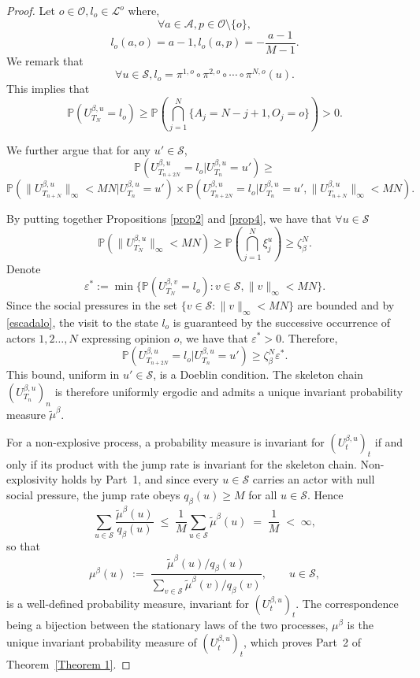 \documentclass[11pt]{article}
\theoremstyle{definition}
\newcommand{\st}{\mathcal{S}}
\def\P{{\mathbb P}}
\begin{document}
\begin{proof}
Let $o\in\mathcal{O}, l_o\in\mathcal{L}^o$ where,
$$
\forall a\in\mathcal{A},p\in\mathcal{O}\setminus\{o\},
$$
$$
    l_o(a,o)=a-1,l_o(a,p)=-\frac{a-1}{M-1}.
$$
We remark that 
$$
    \forall u \in \st, l_o=\pi^{1,o}\circ \pi^{2,o}\circ\cdots\circ\pi^{N,o}(u).
$$
This implies that
\begin{equation} \label{escadalo}
    \mathbb{P}(U_{T_N}^{\beta,u}=l_o)\geq \P\left(\bigcap_{j=1}^N\{A_j=N-j+1,O_j=o\}\right)>0.
\end{equation}

       
We further argue that for any $u'\in\st$,
$$
    \mathbb{P}(U^{\beta,u}_{T_{n+2N}}=l_o|U^{\beta,u}_{T_n}=u')\geq
$$
$$
    \mathbb{P}(\|U^{\beta,u}_{T_{n+N}}\|_\infty<MN|U^{\beta,u}_{T_n}=u')\times\mathbb{P}(U^{\beta,u}_{T_{n+2N}}=l_o|U^{\beta,u}_{T_n}=u',\|U^{\beta,u}_{T_{n+N}}\|_\infty<MN).
    $$

By putting together Propositions \ref{prop2} and \ref{prop4}, we have that $\forall u\in\st$
$$
\mathbb{P}(\|U^{\beta,u}_{T_N}\|_\infty<MN)\geq\mathbb{P}(\bigcap_{j=1}^N\xi_j^u)\geq \zeta^N_\beta.
 $$
Denote
$$
\varepsilon^*:=\min\{\mathbb{P}(U^{\beta,v}_{T_{N}}=l_o):v\in\st,\|v\|_\infty<MN\}.
$$
Since the social pressures in the set $\{v\in\st:\|v\|_\infty<MN\}$ are bounded and by \eqref{escadalo}, the visit to the state $l_o$ is guaranteed by the successive occurrence of actors $1,2 \ldots, N$ expressing opinion $o$, we have that $\varepsilon^*>0$. Therefore,
$$
        \mathbb{P}(U^{\beta,u}_{T_{n+2N}}=l_o|U^{\beta,u}_{T_n}=u')\geq\zeta^N_\beta\varepsilon^*.
$$
This bound, uniform in $u'\in\st$, is a Doeblin condition. The skeleton chain $(U^{\beta,u}_{T_n})_n$ is therefore uniformly ergodic and
admits a unique invariant probability measure $\tilde{\mu}^\beta$.

For a non-explosive process, a probability measure is invariant for
$(U^{\beta,u}_t)_t$ if and only if its product with the jump rate is invariant
for the skeleton chain. Non-explosivity holds by Part~1, and since every
$u\in\st$ carries an actor with null social pressure, the jump rate obeys
$q_\beta(u)\geq M$ for all $u\in\st$. Hence
$$
    \sum_{u\in\st}\frac{\tilde{\mu}^\beta(u)}{q_\beta(u)}
    \;\leq\;\frac{1}{M}\sum_{u\in\st}\tilde{\mu}^\beta(u)
    \;=\;\frac{1}{M}\;<\;\infty,
$$
so that
\begin{equation}
    \mu^\beta(u)\;:=\;\frac{\tilde{\mu}^\beta(u)/q_\beta(u)}
    {\sum_{v\in\st}\tilde{\mu}^\beta(v)/q_\beta(v)},
    \qquad u\in\st, \label{eq:invariant_measure_def}
\end{equation}
is a well-defined probability measure, invariant for $(U^{\beta,u}_t)_t$. The
correspondence being a bijection between the stationary laws of the two
processes, $\mu^\beta$ is the unique invariant probability measure of
$(U^{\beta,u}_t)_t$, which proves Part~2 of Theorem~\ref{Theorem 1}.
    
\end{proof}
\end{document}
